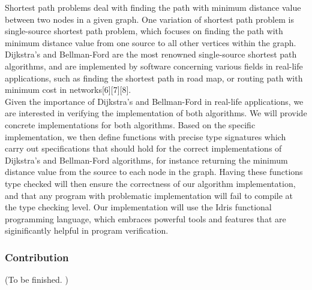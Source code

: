 
Shortest path problems deal with finding the path with minimum distance value between two nodes in a given graph. One variation of shortest path problem is single-source shortest path problem, which focuses on finding the path with minimum distance value from one source to all other vertices within the graph. Dijkstra's and Bellman-Ford are the most renowned single-source shortest path algorithms, and are implemented by software concerning various fields in real-life applications, such as finding the shortest path in road map, or routing path with minimum cost in networks[6][7][8]. 
\\

Given the importance of Dijkstra's and Bellman-Ford in real-life applications, we are interested in verifying the implementation of both algorithms. We will provide concrete implementations for both algorithms. Based on the specific implementation, we then define functions with precise type signatures which carry out specifications that should hold for the correct implementations of Dijkstra's and Bellman-Ford algorithms, for instance returning the minimum distance value from the source to each node in the graph. Having these functions type checked will then ensure the correctness of our algorithm implementation, and that any program with problematic implementation will fail to compile at the type checking level. Our implementation will use the Idris functional programming language, which embraces powerful tools and features that are siginificantly helpful in program verification.

\subsubsection*{Contribution}
(To be finished. )
\\

